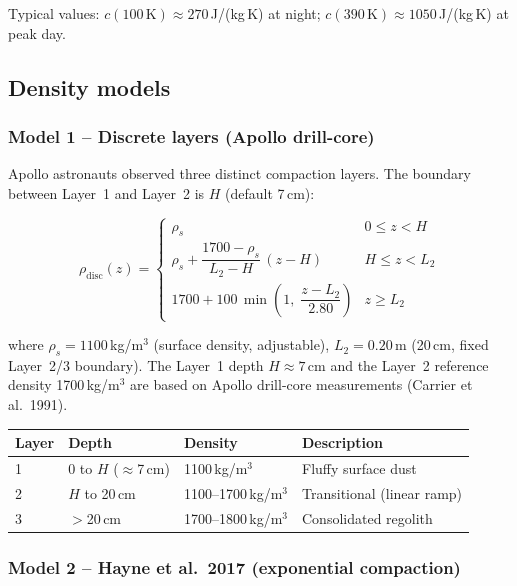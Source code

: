 \documentclass[12pt, a4paper]{article}
\begin{document}
Typical values:
$c(100\,\mathrm{K}) \approx 270$\,J/(kg\,K) at night;
$c(390\,\mathrm{K}) \approx 1050$\,J/(kg\,K) at peak day.

\subsection{Density models}

\subsubsection{Model 1 -- Discrete layers (Apollo drill-core)}

Apollo astronauts observed three distinct compaction layers.
The boundary between Layer~1 and Layer~2 is $H$ (default 7\,cm):

\begin{equation}
  \rho_{\mathrm{disc}}(z) =
  \begin{cases}
    \rho_s
      & 0 \le z < H \\[4pt]
    \rho_s + \dfrac{1700 - \rho_s}{L_2 - H}\,(z - H)
      & H \le z < L_2 \\[8pt]
    1700 + 100\,\min\!\left(1,\;\dfrac{z - L_2}{2.80}\right)
      & z \ge L_2
  \end{cases}
  \label{eq:density_discrete}
\end{equation}

where $\rho_s = 1100$\,kg/m$^3$ (surface density, adjustable),
$L_2 = 0.20$\,m (20\,cm, fixed Layer~2/3 boundary).
The Layer~1 depth $H \approx 7$\,cm and the Layer~2 reference density
1700\,kg/m$^3$ are based on Apollo drill-core measurements
(Carrier et al.\ 1991).

\begin{center}
\begin{tabular}{llll}
\toprule
Layer & Depth & Density & Description \\
\midrule
1 & 0 to $H$ ($\approx$7\,cm) & 1100\,kg/m$^3$ & Fluffy surface dust \\
2 & $H$ to 20\,cm & 1100--1700\,kg/m$^3$ & Transitional (linear ramp) \\
3 & $>$20\,cm & 1700--1800\,kg/m$^3$ & Consolidated regolith \\
\bottomrule
\end{tabular}
\end{center}

\subsubsection{Model 2 -- Hayne et al.\ 2017 (exponential compaction)}
\end{document}
